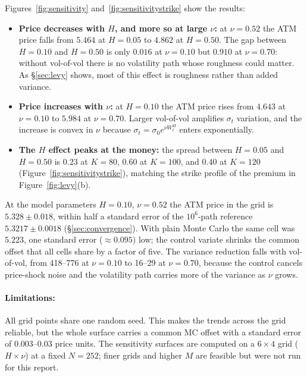 Figures~\ref{fig:sensitivity} and~\ref{fig:sensitivitystrike} show the
results:

\begin{itemize}
  \item \textbf{Price decreases with $H$, and more so at large $\nu$:} at
        $\nu = 0.52$ the ATM price falls from $5.464$ at $H = 0.05$ to $4.862$ at
        $H = 0.50$.  The gap between $H = 0.10$ and $H = 0.50$ is only $0.016$ at
        $\nu = 0.10$ but $0.910$ at $\nu = 0.70$: without vol-of-vol there is no
        volatility path whose roughness could matter.  As §\ref{sec:levy} shows,
        most of this effect is roughness rather than added variance.

  \item \textbf{Price increases with $\nu$:} at $H = 0.10$ the ATM price rises from
        $4.643$ at $\nu = 0.10$ to $5.984$ at $\nu = 0.70$.  Larger vol-of-vol
        amplifies $\sigma_t$ variation, and the increase is convex in $\nu$ because
        $\sigma_t = \sigma_0 e^{\nu W_t^H}$ enters exponentially.

  \item \textbf{The $H$ effect peaks at the money:} the spread between $H = 0.05$
        and $H = 0.50$ is $0.23$ at $K = 80$, $0.60$ at $K = 100$, and $0.40$ at
        $K = 120$ (Figure~\ref{fig:sensitivitystrike}), matching the strike profile
        of the premium in Figure~\ref{fig:levy}(b).
\end{itemize}

At the model parameters $H = 0.10$, $\nu = 0.52$ the ATM price in the grid is
$5.328 \pm 0.018$, within half a standard error of the $10^6$-path reference
$5.3217 \pm 0.0018$ (§\ref{sec:convergence}).  With plain Monte Carlo the same cell
was $5.223$, one standard error ($\approx 0.095$) low; the control variate shrinks the
common offset that all cells share by a factor of five.  The variance reduction falls
with vol-of-vol, from 418--776 at $\nu = 0.10$ to 16--29 at $\nu = 0.70$, because the
control cancels price-shock noise and the volatility path carries more of the
variance as $\nu$ grows.

\paragraph{Limitations: }
All grid points share one random seed.  This makes the trends across the grid
reliable, but the whole surface carries a common MC offset with a standard error of
0.003--0.03 price units.  The sensitivity surfaces are computed on a $6 \times 4$ grid
($H \times \nu$) at a fixed $N = 252$; finer grids and higher $M$ are feasible but
were not run for this report.
